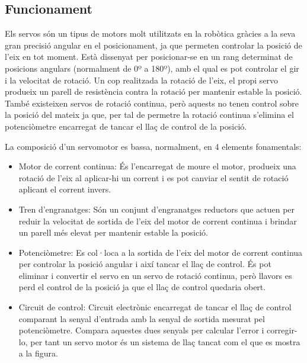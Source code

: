 \subsection{Funcionament}

Els servos són un tipus de motors molt utilitzats en la robòtica gràcies a la seva gran precisió  angular en el posicionament, ja que permeten controlar la posició de l’eix en tot moment. Està dissenyat per posicionar-se en un rang determinat de posicions angulars (normalment de 0º a 180º), amb el qual es pot controlar el gir i la velocitat de rotació. Un cop realitzada la rotació de l’eix, el propi servo produeix un parell de resistència contra la rotació per mantenir estable la posició. També existeixen servos de rotació continua, però aquests no tenen control sobre la posició del mateix ja que, per tal de permetre la rotació continua s'elimina el potenciòmetre encarregat de tancar el llaç de control de la posició.

La composició d’un servomotor es bassa, normalment, en 4 elements fonamentals: 
\begin{itemize}

	\item	Motor de corrent continua: És l’encarregat de moure el motor, produeix una rotació de l’eix al aplicar-hi un corrent i es pot canviar el sentit de rotació aplicant el corrent invers.
	
	\item	Tren d’engranatges: Són un conjunt d’engranatges reductors que actuen per reduir la velocitat de sortida de l’eix del motor de corrent continua i brindar un parell més elevat per mantenir estable la posició.
	
	\item	Potenciòmetre: Es col·loca a la sortida de l’eix del motor de corrent continua per controlar la posició angular i així tancar el llaç de control. És pot eliminar i convertir el servo en un servo de rotació continua, però llavors es perd el control de la posició ja que el llaç de control quedaria obert.
	
	\item	Circuit de control:  Circuit electrònic encarregat de tancar el llaç de control comparant la senyal d’entrada amb la senyal de sortida mesurat pel potenciòmetre. Compara aquestes dues senyals per calcular l’error i corregir-lo, per tant un servo motor és un sistema de llaç tancat com el que es mostra a la figura. 
	
\end{itemize}

